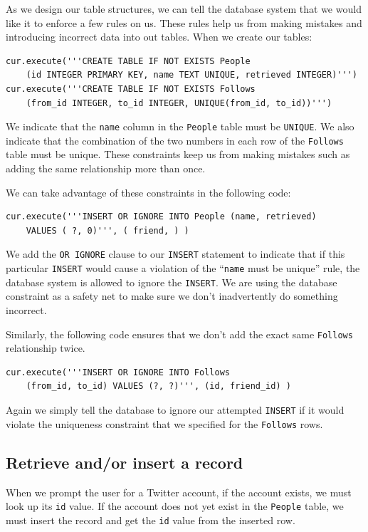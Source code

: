 As we design our table structures, we can tell the database system 
that we would like it to enforce a few rules on us.   These rules
help us from making mistakes and introducing incorrect data into 
out tables.   When we create our tables:

\beforeverb
\begin{verbatim}
cur.execute('''CREATE TABLE IF NOT EXISTS People 
    (id INTEGER PRIMARY KEY, name TEXT UNIQUE, retrieved INTEGER)''')
cur.execute('''CREATE TABLE IF NOT EXISTS Follows 
    (from_id INTEGER, to_id INTEGER, UNIQUE(from_id, to_id))''')
\end{verbatim}
\afterverb
%
We indicate that the {\tt name} column in the {\tt People} table must be
{\tt UNIQUE}.   We also indicate that the combination of the two numbers
in each row of the {\tt Follows} table must be unique.  These constraints
keep us from making mistakes such as adding the same relationship more than
once.

We can take advantage of these constraints in the following code:

\beforeverb
\begin{verbatim}
cur.execute('''INSERT OR IGNORE INTO People (name, retrieved) 
    VALUES ( ?, 0)''', ( friend, ) )
\end{verbatim}
\afterverb
%
We add the {\tt OR IGNORE} clause to our {\tt INSERT} statement to indicate
that if this particular {\tt INSERT} would cause a violation of the
``{\tt name} must be unique'' rule, the database system is allowed to ignore the 
{\tt INSERT}.  We are using the database constraint as a safety net
to make sure we don't inadvertently do something incorrect.

Similarly, the following code ensures that we don't add the 
exact same {\tt Follows} relationship twice.

\beforeverb
\begin{verbatim}
cur.execute('''INSERT OR IGNORE INTO Follows 
    (from_id, to_id) VALUES (?, ?)''', (id, friend_id) )
\end{verbatim}
\afterverb
%
Again we simply tell the database to ignore our attempted 
{\tt INSERT} if it would violate the uniqueness constraint
that we specified for the {\tt Follows} rows.

\subsection{Retrieve and/or insert a record}

When we prompt the user for a Twitter account, if the account 
exists, we must look up its {\tt id} value.  If the account
does not yet exist in the {\tt People} table, we must insert 
the record and get the {\tt id} value from the inserted
row.

